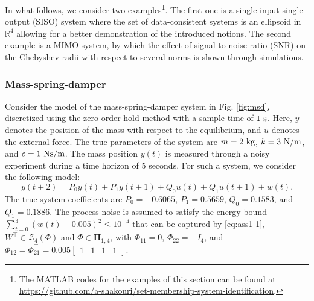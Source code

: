 \documentclass[pdflatex,sn-mathphys-num]{sn-jnl}%
\theoremstyle{thmstyleone}
\begin{document}
In what follows, we consider two examples\footnote{The MATLAB codes for the examples of this section can be found at \href{https://github.com/a-shakouri/set-membership-system-identification}{https://github.com/a-shakouri/set-membership-system-identification}.}. The first one is a single-input single-output (SISO) system where the set of data-consistent systems is an ellipsoid in $\mathbb{R}^4$ allowing for a better demonstration of the introduced notions. The second example is a MIMO system, by which the effect of signal-to-noise ratio (SNR) on the Chebyshev radii with respect to several norms is shown through simulations. 

\subsubsection{Mass-spring-damper}

Consider the model of the mass-spring-damper system in Fig. \ref{fig:msd}, discretized using the zero-order hold method with a sample time of $1\ \textup{s}$. Here, $y$ denotes the position of the mass with respect to the equilibrium, and $u$ denotes the external force. The true parameters of the system are $m=2\ \textup{kg}$, $k=3\ \textup{N/m}$, and $c=1\ \textup{Ns/m}$. The mass position $y(t)$ is measured through a noisy experiment during a time horizon of $5$ seconds. For such a system, we consider the following model:
\begin{equation}
y(t+2)=P_0 y(t)+P_1 y(t+1)+Q_0 u(t) +Q_1 u(t+1)+w(t).
\end{equation}
The true system coefficients are $P_0=-0.6065$, $P_1=0.5659$, $Q_0=0.1583$, and \mbox{$Q_1=0.1886$}. The process noise is assumed to satisfy the energy bound \mbox{$\sum_{t=0}^3(w(t)-0.005)^2\leq 10^{-4}$} that can be captured by \eqref{eq:ass1-1}, $W_-^\top\in\mathcal{Z}_4(\Phi)$ and $\Phi\in\pmb{\Pi}_{1,4}^-$, with $\Phi_{11}=0$, $\Phi_{22}=-I_4$, and $\Phi_{12}=\Phi_{21}^\top=0.005\begin{bmatrix}
1 & 1 & 1 & 1
\end{bmatrix}$. 
\end{document}
